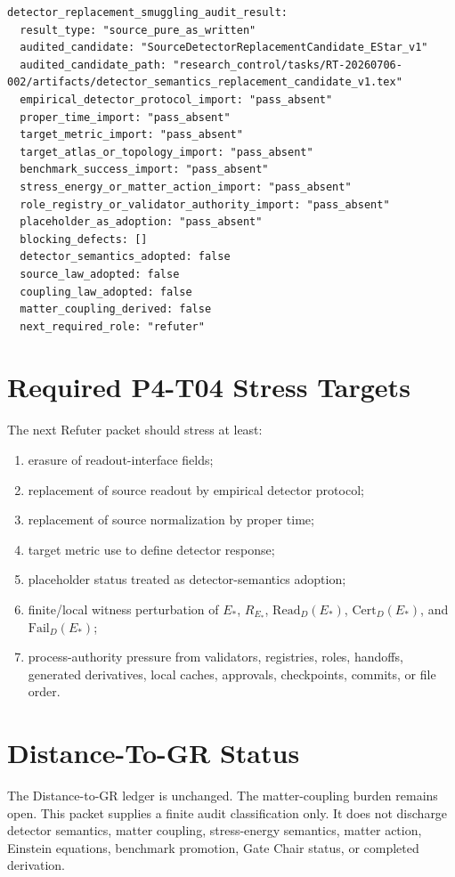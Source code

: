 \documentclass[11pt]{article}
\newcommand{\EStar}{E_{\ast}}
\newcommand{\RStar}{R_{E_{\ast}}}
\newcommand{\ReadD}{\mathrm{Read}_{D}(E_{\ast})}
\newcommand{\CertD}{\mathrm{Cert}_{D}(E_{\ast})}
\newcommand{\FailD}{\mathrm{Fail}_{D}(E_{\ast})}
\begin{document}
\begin{verbatim}
detector_replacement_smuggling_audit_result:
  result_type: "source_pure_as_written"
  audited_candidate: "SourceDetectorReplacementCandidate_EStar_v1"
  audited_candidate_path: "research_control/tasks/RT-20260706-002/artifacts/detector_semantics_replacement_candidate_v1.tex"
  empirical_detector_protocol_import: "pass_absent"
  proper_time_import: "pass_absent"
  target_metric_import: "pass_absent"
  target_atlas_or_topology_import: "pass_absent"
  benchmark_success_import: "pass_absent"
  stress_energy_or_matter_action_import: "pass_absent"
  role_registry_or_validator_authority_import: "pass_absent"
  placeholder_as_adoption: "pass_absent"
  blocking_defects: []
  detector_semantics_adopted: false
  source_law_adopted: false
  coupling_law_adopted: false
  matter_coupling_derived: false
  next_required_role: "refuter"
\end{verbatim}

\section{Required P4-T04 Stress Targets}

The next Refuter packet should stress at least:

\begin{enumerate}[label=(\alph*)]
  \item erasure of readout-interface fields;
  \item replacement of source readout by empirical detector protocol;
  \item replacement of source normalization by proper time;
  \item target metric use to define detector response;
  \item placeholder status treated as detector-semantics adoption;
  \item finite/local witness perturbation of \(\EStar\), \(\RStar\),
        \(\ReadD\), \(\CertD\), and \(\FailD\);
  \item process-authority pressure from validators, registries, roles,
        handoffs, generated derivatives, local caches, approvals,
        checkpoints, commits, or file order.
\end{enumerate}

\section{Distance-To-GR Status}

The Distance-to-GR ledger is unchanged. The matter-coupling burden remains
open. This packet supplies a finite audit classification only. It does not
discharge detector semantics, matter coupling, stress-energy semantics, matter
action, Einstein equations, benchmark promotion, Gate Chair status, or
completed derivation.
\end{document}

